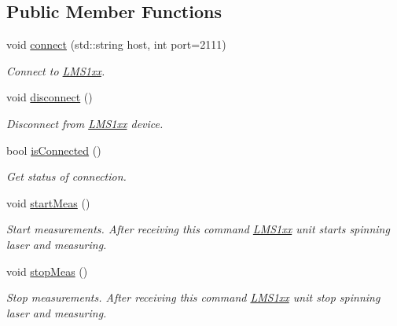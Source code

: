 \subsection*{Public Member Functions}
\begin{DoxyCompactItemize}
\item 
void \hyperlink{classLMS1xx_ae907a9e0c30a7cb34bdcbf44589ba9cc}{connect} (std\+::string host, int port=2111)
\begin{DoxyCompactList}\small\item\em Connect to \hyperlink{classLMS1xx}{L\+M\+S1xx}. \end{DoxyCompactList}\item 
\mbox{\label{classLMS1xx_ac8d7e180f1c359e380ed3380f75fbe55}} 
void \hyperlink{classLMS1xx_ac8d7e180f1c359e380ed3380f75fbe55}{disconnect} ()
\begin{DoxyCompactList}\small\item\em Disconnect from \hyperlink{classLMS1xx}{L\+M\+S1xx} device. \end{DoxyCompactList}\item 
bool \hyperlink{classLMS1xx_a8f876ce189ccbc0d5f9e6673f8b744e1}{is\+Connected} ()
\begin{DoxyCompactList}\small\item\em Get status of connection. \end{DoxyCompactList}\item 
\mbox{\label{classLMS1xx_a115f541f0d1a82b358a00c61a5aed802}} 
void \hyperlink{classLMS1xx_a115f541f0d1a82b358a00c61a5aed802}{start\+Meas} ()
\begin{DoxyCompactList}\small\item\em Start measurements. After receiving this command \hyperlink{classLMS1xx}{L\+M\+S1xx} unit starts spinning laser and measuring. \end{DoxyCompactList}\item 
\mbox{\label{classLMS1xx_a07c45a5915ab9dc8da4be0d70b305097}} 
void \hyperlink{classLMS1xx_a07c45a5915ab9dc8da4be0d70b305097}{stop\+Meas} ()
\begin{DoxyCompactList}\small\item\em Stop measurements. After receiving this command \hyperlink{classLMS1xx}{L\+M\+S1xx} unit stop spinning laser and measuring. \end{DoxyCompactList}\item 

\end{DoxyCompactItemize}

